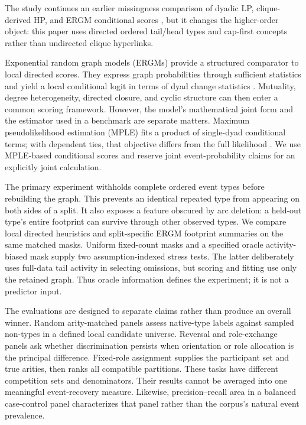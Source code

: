\documentclass[10pt]{article}
\begin{document}
The study continues an earlier missingness comparison of dyadic LP, clique-derived HP, and ERGM conditional scores \citep{boudourides2026}, but it changes the higher-order object: this paper uses directed ordered tail/head types and cap-first concepts rather than undirected clique hyperlinks.

Exponential random graph models (ERGMs) provide a structured comparator to local directed scores. They express graph probabilities through sufficient statistics and yield a local conditional logit in terms of dyad change statistics \citep{wassermanPattison1996,krivitskyEtAl2011}. Mutuality, degree heterogeneity, directed closure, and cyclic structure can then enter a common scoring framework. However, the model's mathematical joint form and the estimator used in a benchmark are separate matters. Maximum pseudolikelihood estimation (MPLE) fits a product of single-dyad conditional terms; with dependent ties, that objective differs from the full likelihood \citep{vanDuijnEtAl2009}. We use MPLE-based conditional scores and reserve joint event-probability claims for an explicitly joint calculation.

The primary experiment withholds complete ordered event types before rebuilding the graph. This prevents an identical repeated type from appearing on both sides of a split. It also exposes a feature obscured by arc deletion: a held-out type's entire footprint can survive through other observed types. We compare local directed heuristics and split-specific ERGM footprint summaries on the same matched masks. Uniform fixed-count masks and a specified oracle activity-biased mask supply two assumption-indexed stress tests. The latter deliberately uses full-data tail activity in selecting omissions, but scoring and fitting use only the retained graph. Thus oracle information defines the experiment; it is not a predictor input.

The evaluations are designed to separate claims rather than produce an overall winner. Random arity-matched panels assess native-type labels against sampled non-types in a defined local candidate universe. Reversal and role-exchange panels ask whether discrimination persists when orientation or role allocation is the principal difference. Fixed-role assignment supplies the participant set and true arities, then ranks all compatible partitions. These tasks have different competition sets and denominators. Their results cannot be averaged into one meaningful event-recovery measure. Likewise, precision--recall area in a balanced case-control panel characterizes that panel rather than the corpus's natural event prevalence.
\end{document}
